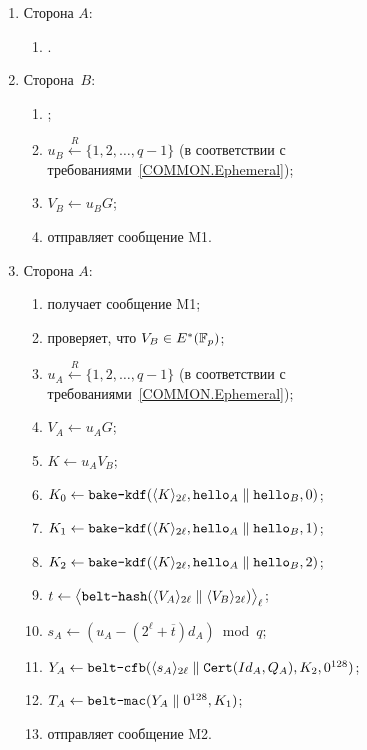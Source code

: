 \begin{enumerate}
\item
Сторона $A$:
\begin{enumerate}
\item
{}.
\end{enumerate}

\item
Сторона~$B$:
\begin{enumerate}
\item
{};
\item
$u_B\stackrel{R}{\leftarrow}\{1,2,\ldots,q-1\}$
(в соответствии с требованиями~\ref{COMMON.Ephemeral});
\item
$V_B\leftarrow u_B G$;
\item
отправляет сообщение M1.
\end{enumerate}

\item
Сторона $A$:
\begin{enumerate}
\item
получает сообщение M1;
\item
проверяет, что $V_B\in E^*(\mathbb{F}_p)$;
\item
$u_A\stackrel{R}{\leftarrow}\{1,2,\ldots,q-1\}$
(в соответствии с требованиями~\ref{COMMON.Ephemeral});
\item
$V_A\leftarrow u_{A} G$;
\item
$K\leftarrow u_A V_B$;
\item
$K_0\leftarrow\texttt{bake-kdf}
(\langle K\rangle_{2\ell},\texttt{hello}_A\parallel\texttt{hello}_B,0)$;
\item
$K_1\leftarrow\texttt{bake-kdf}
(\langle K\rangle_{2\ell},\texttt{hello}_A\parallel\texttt{hello}_B,1)$;
\item
$K_2\leftarrow\texttt{bake-kdf}
(\langle K\rangle_{2\ell},\texttt{hello}_A\parallel\texttt{hello}_B,2)$;
\item
$t\leftarrow\bigl\langle\texttt{belt-hash}(
\langle V_A\rangle_{2\ell}\parallel\langle V_B\rangle_{2\ell})
\bigr\rangle_\ell$;
\item
$s_A\leftarrow (u_A-(2^\ell +\overline{t})d_A)\bmod q$;
\item
$Y_A\leftarrow\texttt{belt-cfb}
(\langle s_A\rangle_{2\ell}\parallel\texttt{Cert}(Id_A,Q_A),K_2,0^{128})$;
\item
$T_A\leftarrow\texttt{belt-mac}(Y_A\parallel 0^{128}, K_1)$;
\item
отправляет сообщение M2.
\end{enumerate}


\end{enumerate}
